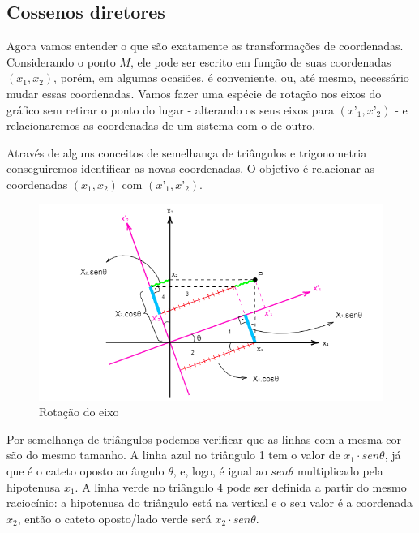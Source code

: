 \documentclass[12pt,a4paper]{article}
\begin{document}

\subsection{Cossenos diretores}

Agora vamos entender o que são exatamente as transformações de coordenadas. Considerando o ponto $M$, ele pode ser escrito em função de suas coordenadas $(x_1,x_2)$, porém, em algumas ocasiões, é conveniente, ou, até mesmo, necessário mudar essas coordenadas. Vamos fazer uma espécie de rotação nos eixos do gráfico sem retirar o ponto do lugar - alterando os seus eixos para $(x’_1,x’_2)$ - e relacionaremos as coordenadas de um sistema com o de outro.

Através de alguns conceitos de semelhança de triângulos e trigonometria conseguiremos identificar as novas coordenadas. O objetivo é relacionar as coordenadas $(x_1,x_2)$ com $(x’_1,x’_2)$.


\begin{figure}[H]
    \centering
    \includegraphics[width=16.5cm]{rotacao.png} %
    \caption{Rotação do eixo}
    \label{Fig01} %
\end{figure}


Por semelhança de triângulos podemos verificar que as linhas com a mesma cor são do mesmo tamanho. A linha azul no triângulo 1 tem o valor de $x_1 \cdot sen\theta$, já que é o cateto oposto ao ângulo $\theta$, e, logo, é igual ao $sen\theta$ multiplicado pela hipotenusa $x_1$. A linha verde no triângulo 4 pode ser definida a partir do mesmo raciocínio: a hipotenusa do triângulo está na vertical e o seu valor é a coordenada $x_2$, então o cateto oposto/lado verde será $x_2 \cdot sen\theta$.
\end{document}

